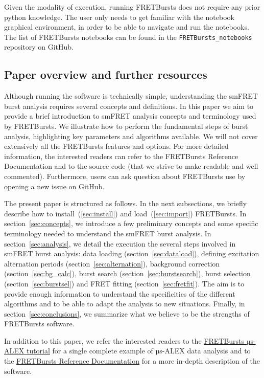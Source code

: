 Given the modality of execution, running FRETBursts does not require
any prior python knowledge. The user only needs to get familiar with the
notebook graphical environment, in order to be able to navigate and run the notebooks.
The list of FRETBursts notebooks can be found in the 
\verb|FRETBursts_notebooks| repository on GitHub.

\subsection{Paper overview and further resources}

Although running the software is technically simple, understanding the smFRET 
burst analysis requires several concepts and definitions.
In this paper we aim to provide a brief introduction to smFRET analysis concepts
and terminology used by FRETBursts. We illustrate how to perform
the fundamental steps of burst analysis, highlighting key parameters
and algorithms available. We will not cover extensively all the FRETBursts
features and options. For more detailed information, the interested readers can refer 
to the FRETBursts Reference Documentation and to the source code (that we strive 
to make readable and well commented). 
Furthermore, users can ask question about FRETBursts use by opening a new issue on GitHub.

The present paper is structured as follows. 
In the next subsections, we briefly describe how to install~(\ref{sec:install}) and 
load~(\ref{sec:import}) FRETBursts.
In section~\ref{sec:concepts}, we
introduce a few preliminary concepts and some specific terminology needed 
to understand the smFRET burst analysis. 
In section~\ref{sec:analysis}, we detail the execution the several steps involved
in smFRET burst analysis: data loading (section~\ref{sec:dataload}), defining 
excitation alternation periods (section~\ref{sec:alternation}), background 
correction (section~\ref{sec:bg_calc}), burst search (section~\ref{sec:burstsearch}), 
burst selection (section~\ref{sec:burstsel}) and FRET fitting (section~\ref{sec:fretfit}).
The aim is to provide enough information to understand the specificities of 
the different algorithms and to be able to adapt the analysis to new situations.
Finally, in section~\ref{sec:conclusions}, we summarize what we believe to be
the strengths of FRETBursts software.

In addition to this paper, we refer the interested readers to the 
\href{http://nbviewer.ipython.org/github/tritemio/FRETBursts_notebooks/blob/master/notebooks/FRETBursts\%20-\%20us-ALEX\%20smFRET\%20burst\%20analysis.ipynb}{FRETBursts µs-ALEX tutorial} 
for a single complete example of µs-ALEX data analysis and to the
\href{http://fretbursts.readthedocs.org/}{FRETBursts Reference Documentation}
for a more in-depth description of the software.

